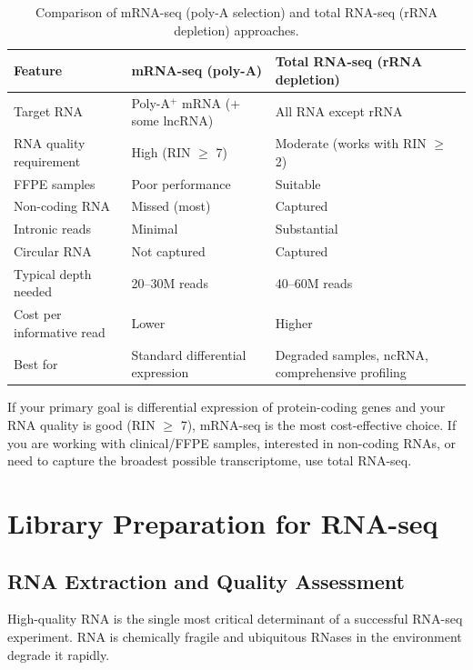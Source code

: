 \begin{table}[htbp]
\centering
\caption{Comparison of mRNA-seq (poly-A selection) and total RNA-seq (rRNA
depletion) approaches.}
\label{tab:rnaseq:mrna_vs_total}
\small
\begin{tabularx}{\textwidth}{lXX}
\toprule
\textbf{Feature} & \textbf{mRNA-seq (poly-A)} & \textbf{Total RNA-seq (rRNA depletion)} \\
\midrule
Target RNA & Poly-A$^+$ mRNA (+ some lncRNA) & All RNA except rRNA \\
RNA quality requirement & High (RIN $\geq$ 7) & Moderate (works with RIN $\geq$ 2) \\
FFPE samples & Poor performance & Suitable \\
Non-coding RNA & Missed (most) & Captured \\
Intronic reads & Minimal & Substantial \\
Circular RNA & Not captured & Captured \\
Typical depth needed & 20--30M reads & 40--60M reads \\
Cost per informative read & Lower & Higher \\
Best for & Standard differential expression & Degraded samples, ncRNA, comprehensive profiling \\
\bottomrule
\end{tabularx}
\end{table}

\begin{tipbox}
If your primary goal is differential expression of protein-coding genes and your
RNA quality is good (RIN $\geq$ 7), mRNA-seq is the most cost-effective choice.
If you are working with clinical/FFPE samples, interested in non-coding RNAs, or
need to capture the broadest possible transcriptome, use total RNA-seq.
\end{tipbox}


\section{Library Preparation for RNA-seq}
\label{sec:rnaseq:library}

\subsection{RNA Extraction and Quality Assessment}

High-quality RNA is the single most critical determinant of a successful
\acrshort{RNA-seq} experiment. RNA is chemically fragile and ubiquitous RNases
in the environment degrade it rapidly.

